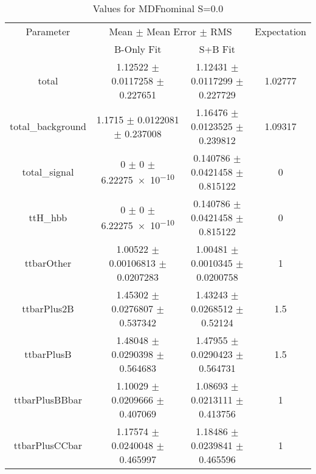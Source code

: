 \begin{table}
\centering
\caption{Values for MDFnominal S=0.0}
\begin{tabular}{cccc}
\toprule
Parameter & \multicolumn{2}{c}{Mean $\pm$ Mean Error $\pm$ RMS} & Expectation\\
 & B-Only Fit & S+B Fit & \\
\midrule
total & \num{1.12522} $\pm$ \num{0.0117258} $\pm$ \num{0.227651} & \num{1.12431} $\pm$ \num{0.0117299} $\pm$ \num{0.227729} & \num{1.02777}\\
total\_background & \num{1.1715} $\pm$ \num{0.0122081} $\pm$ \num{0.237008} & \num{1.16476} $\pm$ \num{0.0123525} $\pm$ \num{0.239812} & \num{1.09317}\\
total\_signal & \num{0} $\pm$ \num{0} $\pm$ \num{6.22275e-10} & \num{0.140786} $\pm$ \num{0.0421458} $\pm$ \num{0.815122} & \num{0}\\
ttH\_hbb & \num{0} $\pm$ \num{0} $\pm$ \num{6.22275e-10} & \num{0.140786} $\pm$ \num{0.0421458} $\pm$ \num{0.815122} & \num{0}\\
ttbarOther & \num{1.00522} $\pm$ \num{0.00106813} $\pm$ \num{0.0207283} & \num{1.00481} $\pm$ \num{0.0010345} $\pm$ \num{0.0200758} & \num{1}\\
ttbarPlus2B & \num{1.45302} $\pm$ \num{0.0276807} $\pm$ \num{0.537342} & \num{1.43243} $\pm$ \num{0.0268512} $\pm$ \num{0.52124} & \num{1.5}\\
ttbarPlusB & \num{1.48048} $\pm$ \num{0.0290398} $\pm$ \num{0.564683} & \num{1.47955} $\pm$ \num{0.0290423} $\pm$ \num{0.564731} & \num{1.5}\\
ttbarPlusBBbar & \num{1.10029} $\pm$ \num{0.0209666} $\pm$ \num{0.407069} & \num{1.08693} $\pm$ \num{0.0213111} $\pm$ \num{0.413756} & \num{1}\\
ttbarPlusCCbar & \num{1.17574} $\pm$ \num{0.0240048} $\pm$ \num{0.465997} & \num{1.18486} $\pm$ \num{0.0239841} $\pm$ \num{0.465596} & \num{1}\\
\bottomrule
\end{tabular}
\end{table}